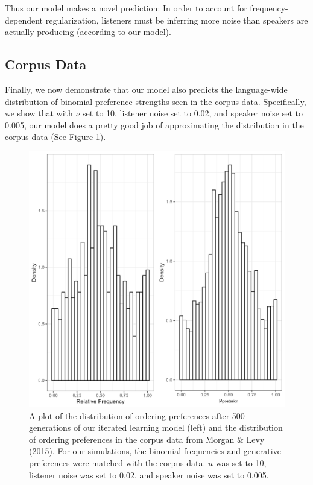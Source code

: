 \documentclass[10pt, letterpaper]{article}
\newenvironment{CodeChunk}{}{}
\begin{document}
Thus our model makes a novel prediction: In order to account for
frequency-dependent regularization, listeners must be inferring more
noise than speakers are actually producing (according to our model).

\hypertarget{corpus-data}{%
\subsection{Corpus Data}\label{corpus-data}}

Finally, we now demonstrate that our model also predicts the
language-wide distribution of binomial preference strengths seen in the
corpus data. Specifically, we show that with \(\nu\) set to 10, listener
noise set to 0.02, and speaker noise set to 0.005, our model does a
pretty good job of approximating the distribution in the corpus data
(See Figure \ref{fig:corpusourmodel}).

\begin{CodeChunk}
\begin{figure}[tb]

{\centering \includegraphics[width=1\linewidth]{Figures/corpus_plot_and_ours} 

}

\caption[A plot of the distribution of ordering preferences after 500 generations of our iterated learning model (left) and the distribution of ordering preferences in the corpus data from Morgan \& Levy (2015)]{A plot of the distribution of ordering preferences after 500 generations of our iterated learning model (left) and the distribution of ordering preferences in the corpus data from Morgan \& Levy (2015). For our simulations, the binomial frequencies and generative preferences were matched with the corpus data. $
u$ was set to 10, listener noise was set to 0.02, and speaker noise was set to 0.005.}\label{fig:corpusourmodel}
\end{figure}
\end{CodeChunk}
\end{document}
